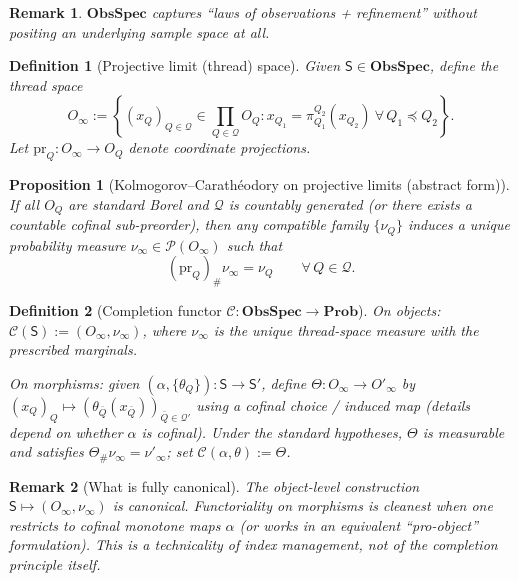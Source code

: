 \documentclass[11pt]{article}
\newtheorem{definition}{Definition}
\newtheorem{proposition}{Proposition}
\newtheorem{remark}{Remark}
\begin{document}
\begin{remark}
$\mathbf{ObsSpec}$ captures “laws of observations + refinement” without positing an underlying
sample space at all.
\end{remark}


\begin{definition}[Projective limit (thread) space]
Given $\mathsf S\in\mathbf{ObsSpec}$, define the thread space
\[
O_\infty := \left\{ (x_Q)_{Q\in\mathcal Q}\in\prod_{Q\in\mathcal Q} O_Q:
x_{Q_1}=\pi^{Q_2}_{Q_1}(x_{Q_2})\ \forall\,Q_1\preceq Q_2\right\}.
\]
Let $\mathrm{pr}_Q:O_\infty\to O_Q$ denote coordinate projections.
\end{definition}

\begin{proposition}[Kolmogorov–Carathéodory on projective limits (abstract form)]
If all $O_Q$ are standard Borel and $\mathcal Q$ is countably generated (or there exists a
countable cofinal sub-preorder), then any compatible family $\{\nu_Q\}$ induces a unique
probability measure $\nu_\infty\in\mathcal P(O_\infty)$ such that
\[
(\mathrm{pr}_Q)_\#\nu_\infty = \nu_Q\qquad\forall\,Q\in\mathcal Q.
\]
\end{proposition}

\begin{definition}[Completion functor $\mathcal C:\mathbf{ObsSpec}\to \mathbf{Prob}$]
On objects: $\mathcal C(\mathsf S):=(O_\infty,\nu_\infty)$, where $\nu_\infty$ is the unique
thread-space measure with the prescribed marginals.

On morphisms: given $(\alpha,\{\theta_Q\}):\mathsf S\to\mathsf S'$, define
$\Theta:O_\infty\to O'_\infty$ by $(x_Q)_Q\mapsto (\theta_{\bar Q}(x_{\bar Q}))_{\bar Q\in\mathcal Q'}$
using a cofinal choice / induced map (details depend on whether $\alpha$ is cofinal).
Under the standard hypotheses, $\Theta$ is measurable and satisfies
$\Theta_\#\nu_\infty=\nu'_\infty$; set $\mathcal C(\alpha,\theta):=\Theta$.
\end{definition}

\begin{remark}[What is fully canonical]
The object-level construction $\mathsf S\mapsto (O_\infty,\nu_\infty)$ is canonical.
Functoriality on morphisms is cleanest when one restricts to cofinal monotone maps $\alpha$
(or works in an equivalent “pro-object” formulation). This is a technicality of index
management, not of the completion principle itself.
\end{remark}
\end{document}
